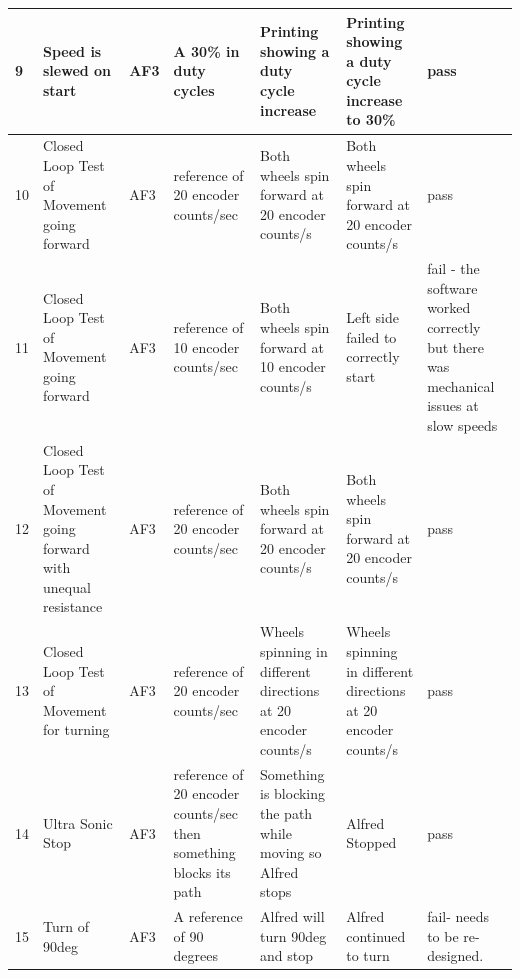 \documentclass [10pt]{article}
\begin{document}
\begin{longtable}{| p{} | p{} | p{} | p{} | p{} | p{} | p{} |}
		9 &  Speed is slewed on start &  AF3 &  A 30\% in duty cycles &  Printing showing a duty cycle increase &  Printing showing a duty cycle increase to 30\% &  pass\\ \hline
		10 &  Closed Loop Test of Movement going forward &  AF3 &  reference of 20 encoder counts/sec &  Both wheels spin forward at 20 encoder counts/s &  Both wheels spin forward at  20 encoder counts/s &   pass\\ \hline
		11 &  Closed Loop Test of Movement going forward &  AF3 &  reference of 10 encoder counts/sec &  Both wheels spin forward at  10 encoder counts/s &  Left side failed to correctly start &  fail - the software worked correctly but there was mechanical issues at slow speeds \\ \hline
		12 &  Closed Loop Test of Movement going forward with unequal resistance &  AF3 &  reference of 20 encoder counts/sec &  Both wheels spin forward at 20 encoder counts/s & Both wheels spin forward at  20 encoder counts/s &   pass
		\\ \hline
		13 &  Closed Loop Test of Movement for turning &  AF3 &  reference of 20 encoder counts/sec &  Wheels spinning in different directions at 20 encoder counts/s & Wheels spinning in different directions at 20 encoder counts/s &  pass 
		\\ \hline
		14 &  Ultra Sonic Stop &  AF3 &  reference of 20 encoder counts/sec then something blocks its path &  Something is blocking the path while moving so Alfred stops &  Alfred Stopped &  pass 
		\\ \hline

		15 &  Turn of 90deg &  AF3 &  A reference of 90 degrees &  Alfred will turn 90deg and stop &  Alfred continued to turn &  fail- needs to be re-designed.
		\\ \hline
	\end{longtable}
\end{document}
